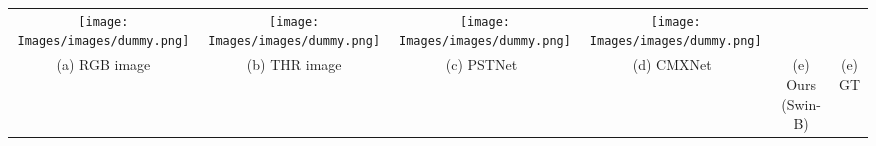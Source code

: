 \documentclass[10pt,twocolumn,letterpaper]{article}
\begin{document}
\begin{figure*}[t]
\begin{center}
{\begin{tabular}{c@{\hskip 0.005\linewidth}c@{\hskip 0.005\linewidth}c@{\hskip 0.005\linewidth}c@{\hskip 0.005\linewidth}c@{\hskip 0.005\linewidth}c}
\texttt{[image: Images/images/dummy.png]} & \texttt{[image: Images/images/dummy.png]} & 
\texttt{[image: Images/images/dummy.png]} & \texttt{[image: Images/images/dummy.png]} \vspace{-0.1in} \\ 
{\footnotesize (a) RGB image} & {\footnotesize (b) THR image} & {\footnotesize (c) PSTNet~\cite{shivakumar2019pst900} } & {\footnotesize (d) CMXNet~\cite{liu2022cmx}} &  {\footnotesize (e) Ours (Swin-B)} &  {\footnotesize (e) GT}  \\ 
\end{tabular}
}
\end{center}
\vspace{-0.2in}
\caption{{\bf Qualitative comparison for semantic segmentation of RGB-T images on PST900~\cite{shivakumar2019pst900} dataset.}}
\label{fig:supple_pst}
\vspace{-0.2in}
\end{figure*}
\end{document}
